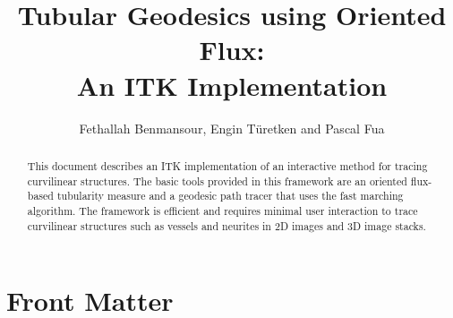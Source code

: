 \documentclass{InsightArticle}
\title{Tubular Geodesics using Oriented Flux: \\An ITK Implementation}
\author{Fethallah Benmansour, Engin T\"uretken and Pascal Fua}
\newcommand{\IJhandlerIDnumber}{3398}
\begin{document}
%
% 
\IJhandlefooter{\IJhandlerIDnumber}


\ifpdf
\else
\fi


\maketitle


\ifhtml
\chapter*{Front Matter\label{front}}
\fi

\begin{abstract}
\noindent
This document describes an ITK implementation of an interactive method for tracing curvilinear structures.
The basic tools provided in this framework are an oriented flux-based tubularity measure and a geodesic path 
tracer that uses the fast marching algorithm. The framework is efficient and requires minimal user 
interaction to trace curvilinear structures such as vessels and neurites in 2D images and 3D image 
stacks.

\end{abstract}

\IJhandlenote{\IJhandlerIDnumber}
\tableofcontents

\end{document}
